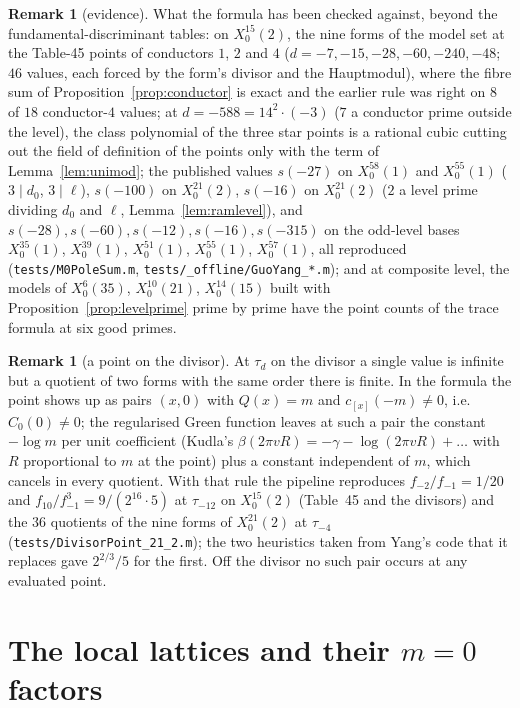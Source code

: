 \documentclass[11pt,reqno]{amsart}
\theoremstyle{plain}
\theoremstyle{definition}
\newtheorem{remark}[theorem]{Remark}
\begin{document}
\begin{remark}[evidence]\label{rem:evidence}
What the formula has been checked against, beyond the fundamental-discriminant tables: on
$X_0^{15}(2)$, the nine forms of the model set at the Table-45 points of conductors $1$, $2$ and
$4$ ($d=-7,-15,-28,-60,-240,-48$; $46$ values, each forced by the form's divisor and the
Hauptmodul), where the fibre sum of Proposition~\ref{prop:conductor} is exact and the earlier rule
was right on $8$ of $18$ conductor-$4$ values; at $d=-588=14^2\cdot(-3)$ ($7$ a conductor prime
outside the level), the class polynomial of the three star points is a rational cubic cutting out
the field of definition of the points only with the term of Lemma~\ref{lem:unimod}; the published
values $s(-27)$ on $X_0^{58}(1)$ and $X_0^{55}(1)$ ($3\mid d_0$, $3\mid\ell$), $s(-100)$ on
$X_0^{21}(2)$, $s(-16)$ on $X_0^{21}(2)$ ($2$ a level prime dividing $d_0$ and $\ell$,
Lemma~\ref{lem:ramlevel}), and $s(-28),s(-60),s(-12),s(-16),s(-315)$ on the odd-level bases
$X_0^{35}(1)$, $X_0^{39}(1)$, $X_0^{51}(1)$, $X_0^{55}(1)$, $X_0^{57}(1)$, all reproduced
(\texttt{tests/M0PoleSum.m}, \texttt{tests/\_offline/GuoYang\_*.m}); and at composite level, the
models of $X_0^6(35)$, $X_0^{10}(21)$, $X_0^{14}(15)$ built with Proposition~\ref{prop:levelprime}
prime by prime have the point counts of the trace formula at six good primes.
\end{remark}

\begin{remark}[a point on the divisor]\label{rem:divisor}
At $\tau_d$ on the divisor a single value is infinite but a quotient of two forms with the same
order there is finite. In the formula the point shows up as pairs $(x,0)$ with $Q(x)=m$ and
$c_{[x]}(-m)\ne0$, i.e.\ $C_0(0)\neq0$; the regularised Green function leaves at such a pair the
constant $-\log m$ per unit coefficient (Kudla's $\beta(2\pi vR)=-\gamma-\log(2\pi vR)+\dots$ with
$R$ proportional to $m$ at the point) plus a constant independent of $m$, which cancels in every
quotient. With that rule the pipeline reproduces $f_{-2}/f_{-1}=1/20$ and $f_{10}/f_{-1}^3=
9/(2^{16}\cdot5)$ at $\tau_{-12}$ on $X_0^{15}(2)$ (Table~45 and the divisors) and the $36$
quotients of the nine forms of $X_0^{21}(2)$ at $\tau_{-4}$ (\texttt{tests/DivisorPoint\_21\_2.m});
the two heuristics taken from Yang's code that it replaces gave $2^{2/3}/5$ for the first. Off the
divisor no such pair occurs at any evaluated point.
\end{remark}

\part{The local lattices and their $m=0$ factors}
\end{document}
